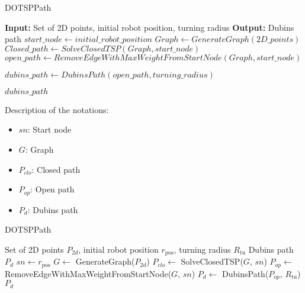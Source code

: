 \begin{algorithm}[H]
    \caption{DOTSPPath}
    \begin{algorithmic}[1]
        \Statex \textbf{Input:} Set of 2D points, initial robot position, turning radius
        \Statex \textbf{Output:} Dubins path
        \newline
        \State $start\_node \gets initial\_robot\_position$
        \State $Graph \gets GenerateGraph(2D\_points)$
        \State $Closed\_path \gets SolveClosedTSP(Graph, start\_node)$
        \State $open\_path \gets RemoveEdgeWithMaxWeightFromStartNode(Graph, start\_node)$
        
        \State $dubins\_path \gets DubinsPath(open\_path, turning\_radius)$
        
        \State \Return $dubins\_path$
    \end{algorithmic}
\end{algorithm}

Description of the notations:
\begin{multicols}{2}
\begin{itemize}[noitemsep,topsep=0pt]
    \item $sn$: Start node
    \item $G$: Graph
    \item $P_{clo}$: Closed path
    \item $P_{op}$: Open path
    \item $P_d$: Dubins path
\end{itemize}
\end{multicols}

\begin{algorithm}[H]
    \caption{DOTSPPath}
    \label{alg:dotsp_path}
    \begin{algorithmic}[1]
    \Require Set of 2D points $P_{2d}$, initial robot position $r_{\text{pos}}$, turning radius $R_{\text{tu}}$
    \Ensure Dubins path $P_d$
    \State $sn \leftarrow r_{\text{pos}}$
    \State $G \leftarrow$ GenerateGraph($P_{2d}$)
    \State $P_{clo} \leftarrow$ SolveClosedTSP($G$, $sn$)
    \State $P_{op} \leftarrow$ RemoveEdgeWithMaxWeightFromStartNode($G$, $sn$)
    \State $P_d \leftarrow$ DubinsPath($P_{op}$, $R_{\text{tu}}$)
    \State \Return $P_d$
    \end{algorithmic}
    \end{algorithm}
    

    


































